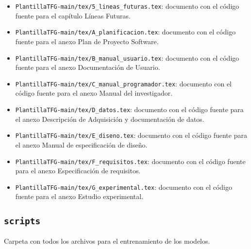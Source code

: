 \begin{itemize}
\begin{itemize}
        \item \texttt{PlantillaTFG-main/tex/5\_lineas\_futuras.tex}: documento con el código fuente para el capítulo Líneas Futuras.
        \item \texttt{PlantillaTFG-main/tex/A\_planificacion.tex}: documento con el código fuente para el anexo Plan de Proyecto Software.
        \item \texttt{PlantillaTFG-main/tex/B\_manual\_usuario.tex}: documento con el código fuente para el anexo Documentación de Usuario.
        \item \texttt{PlantillaTFG-main/tex/C\_manual\_programador.tex}: documento con el código fuente para el anexo Manual del investigador.
        \item \texttt{PlantillaTFG-main/tex/D\_datos.tex}: documento con el código fuente para el anexo Descripción de Adquisición y documentación de datos.
        \item \texttt{PlantillaTFG-main/tex/E\_diseno.tex}: documento con el código fuente para el anexo Manual de especificación de diseño.
        \item \texttt{PlantillaTFG-main/tex/F\_requisitos.tex}: documento con el código fuente para el anexo Especificación de requisitos.
        \item \texttt{PlantillaTFG-main/tex/G\_experimental.tex}: documento con el código fuente para el anexo Estudio experimental.
    \end{itemize}
\end{itemize}

\subsection{\texttt{scripts}}

Carpeta con todos los archivos para el entrenamiento de los modelos.

